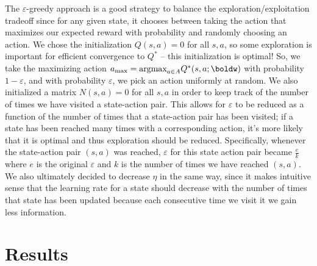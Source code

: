\documentclass[11pt]{article}
\begin{document}
The $\varepsilon$-greedy approach is a good strategy to balance the exploration/exploitation tradeoff since for any given state, it chooses between taking the action that maximizes our expected reward with probability and randomly choosing an action. We chose the initialization $Q(s,a)=0$ for all $s,a$, so some exploration is important for efficient convergence to $Q^{*}$ – this initialization is optimal! So, we take the maximizing action $a_{\text{max}}=\text{argmax}_{a\in A} Q^*(s,a;\boldw)$ with probability $1 - \varepsilon$, and with probability $\varepsilon$, we pick an action uniformly at random. We also initialized a matrix $N(s,a)=0$ for all $s,a$ in order to keep track of the number of times we have visited a state-action pair. This allows for $\varepsilon$ to be reduced as a function of the number of times that a state-action pair has been visited; if a state has been reached many times with a corresponding action, it's more likely that it is optimal and thus exploration should be reduced. Specifically, whenever the state-action pair $(s,a)$ was reached, $\varepsilon$ for this state action pair became $\frac{e}{k}$ where $e$ is the original $\varepsilon$ and $k$ is the number of times we have reached $(s,a)$. We also ultimately decided to decrease $\eta$ in the same way, since it makes intuitive sense that the learning rate for a state should decrease with the number of times that state has been updated because each consecutive time we visit it we gain less information.

\section{Results}
\end{document}

